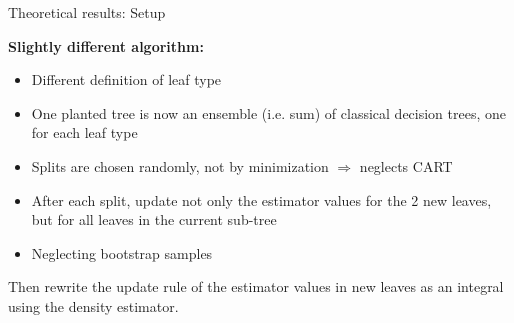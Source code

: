 \documentclass{beamer}
\begin{document}
\begin{frame}{Theoretical results: Setup}
    
    \textbf{Slightly different algorithm:}
    \begin{itemize}
        \item Different definition of leaf type
        \item One planted tree is now an ensemble (i.e. sum) of classical decision trees, one for each leaf type
        \item Splits are chosen randomly, not by minimization \(\Rightarrow\) neglects CART
        \item After each split, update not only the estimator values for the 2 new leaves, but for all leaves in the current sub-tree
        \item Neglecting bootstrap samples
    \end{itemize}

    Then rewrite the update rule of the estimator values in new leaves as an integral using the density estimator.

\end{frame}
\end{document}
